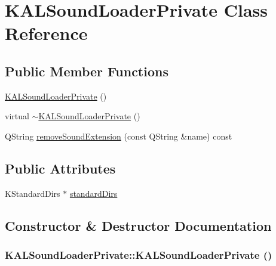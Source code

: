 \hypertarget{class_k_a_l_sound_loader_private}{
\section{KALSoundLoaderPrivate Class Reference}
\label{class_k_a_l_sound_loader_private}
}
\subsection*{Public Member Functions}
\begin{CompactItemize}
\item 
\hyperlink{class_k_a_l_sound_loader_private_b1dcac2173be2550762f3144d52e4f77}{KALSoundLoaderPrivate} ()
\item 
virtual \hyperlink{class_k_a_l_sound_loader_private_074bf63bb649f18038d9aa91ae022b63}{$\sim$KALSoundLoaderPrivate} ()
\item 
QString \hyperlink{class_k_a_l_sound_loader_private_b7fd073b080f828d48a975bba1f97dcf}{removeSoundExtension} (const QString \&name) const 
\end{CompactItemize}
\subsection*{Public Attributes}
\begin{CompactItemize}
\item 
KStandardDirs $\ast$ \hyperlink{class_k_a_l_sound_loader_private_d03da18283e0ea80833e6ae669193014}{standardDirs}
\end{CompactItemize}


\subsection{Constructor \& Destructor Documentation}
\hypertarget{class_k_a_l_sound_loader_private_b1dcac2173be2550762f3144d52e4f77}{
\subsubsection[{KALSoundLoaderPrivate}]{\setlength{\rightskip}{0pt plus 5cm}KALSoundLoaderPrivate::KALSoundLoaderPrivate ()}}
\label{class_k_a_l_sound_loader_private_b1dcac2173be2550762f3144d52e4f77}


